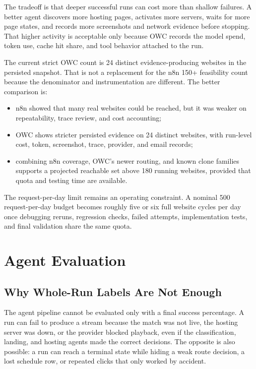 The tradeoff is that deeper successful runs can cost more than shallow failures. A better
agent discovers more hosting pages, activates more servers, waits for more page states,
and records more screenshots and network evidence before stopping. That higher activity
is acceptable only because OWC records the model spend, token use, cache hit share, and
tool behavior attached to the run.



The current strict OWC count is 24 distinct evidence-producing websites in the persisted
snapshot. That is not a replacement for the n8n 150+ feasibility count because the
denominator and instrumentation are different. The better comparison is:
\begin{itemize}
  \item n8n showed that many real websites could be reached, but it was weaker on
  repeatability, trace review, and cost accounting;
  \item OWC shows stricter persisted evidence on 24 distinct websites, with run-level
  cost, token, screenshot, trace, provider, and email records;
  \item combining n8n coverage, OWC's newer routing, and known clone families supports a
  projected reachable set above 180 running websites, provided that quota and testing
  time are available.
\end{itemize}

The request-per-day limit remains an operating constraint. A nominal 500 request-per-day
budget becomes roughly five or six full website cycles per day once debugging reruns,
regression checks, failed attempts, implementation tests, and final validation share
the same quota.

\section{Agent Evaluation}

\subsection{Why Whole-Run Labels Are Not Enough}

The agent pipeline cannot be evaluated only with a final success percentage. A run can
fail to produce a stream because the match was not live, the hosting server was down, or
the provider blocked playback, even if the classification, landing, and hosting agents
made the correct decisions. The opposite is also possible: a run can reach a terminal
state while hiding a weak route decision, a lost schedule row, or repeated clicks that
only worked by accident.

